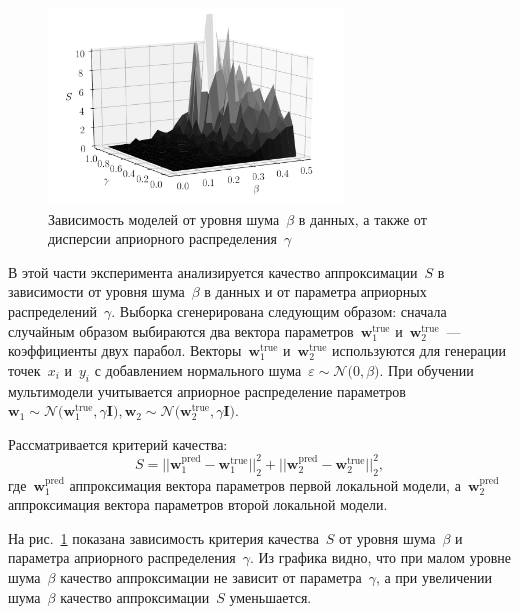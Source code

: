 \documentclass[12pt]{a&t}
\begin{document}
\begin{figure}[h!t]
\begin{center}
    \includegraphics[width=0.7\textwidth]{3dplot}
\end{center}
\caption{Зависимость моделей от уровня шума~$\beta$ в данных, а также от дисперсии априорного распределения~$\gamma$}
\label{ce:fig5}
\end{figure}

В этой части эксперимента анализируется качество аппроксимации~$S$ в зависимости от уровня шума~$\beta$ в данных и от параметра априорных распределений~$\gamma$. Выборка сгенерирована следующим образом: сначала случайным образом выбираются два вектора параметров~$\mathbf{w}^\text{true}_{1}$ и~$\mathbf{w}^\text{true}_{2}$~--- коэффициенты двух парабол. Векторы~$\mathbf {w}^\text {true}_{1}$ и~$\mathbf{w}^\text {true}_{2}$ используются для генерации точек~$x_i$ и~$y_i$ с добавлением нормального шума~$\varepsilon\sim\mathcal {N} \bigr(0,\beta\bigr)$.
При обучении мультимодели учитывается априорное распределение параметров~$\mathbf{w}_1\sim\mathcal{N}\bigr(\mathbf{w}^\text{true}_{1}, \gamma \mathbf{I}\bigr),\mathbf{w}_2\sim\mathcal{N}\bigr(\mathbf{w}^\text{true}_{2}, \gamma\mathbf{I}\bigr)$.

Рассматривается критерий качества:
\[
S = ||\mathbf{w}^\text{pred}_{1} - \mathbf{w}^\text{true}_{1}||^{2}_{2} + ||\mathbf{w}^\text{pred}_{2} - \mathbf{w}^\text{true}_{2}||^{2}_{2},
\]
где~$\mathbf{w}^\text{pred}_{1}$ аппроксимация вектора параметров первой локальной модели, а~$\mathbf{w}^\text{pred}_{2}$ аппроксимация вектора параметров второй локальной модели.

На рис.~\ref{ce:fig5} показана зависимость критерия качества~$S$ от уровня шума~$\beta$ и параметра априорного распределения~$\gamma$. Из графика видно, что при малом уровне шума~$\beta$ качество аппроксимации не зависит от параметра~$\gamma$, а при увеличении шума~$\beta$ качество аппроксимации~$ S$ уменьшается.
\end{document}

